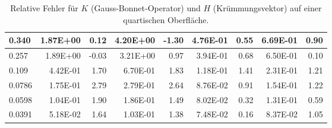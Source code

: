 \begin{table}[htbp]
\begin{tabular}{|l|r|r|r|r|r|r|r|r|}
            0.340 & 1.87E+00 & 0.12 & 4.20E+00 & -1.30 & 4.76E-01 & 0.55 & 6.69E-01 & 0.90 \\ \hline
            0.257 & 1.89E+00 & -0.03 & 3.21E+00 & 0.97 & 3.94E-01 & 0.68 & 6.50E-01 & 0.10 \\ \hline
            0.109 & 4.42E-01 & 1.70 & 6.70E-01 & 1.83 & 1.18E-01 & 1.41 & 2.31E-01 & 1.21 \\ \hline
            0.0786 & 1.75E-01 & 2.79 & 2.79E-01 & 2.64 & 8.76E-02 & 0.91 & 1.54E-01 & 1.22 \\ \hline
            0.0598 & 1.04E-01 & 1.90 & 1.86E-01 & 1.49 & 8.02E-02 & 0.32 & 1.31E-01 & 0.59 \\ \hline
            0.0391 & 5.18E-02 & 1.64 & 1.03E-01 & 1.38 & 7.48E-02 & 0.16 & 8.37E-02 & 1.05 \\ \hline
      \end{tabular}
      \caption[Gauß-Bonnet und Krümmungsvektor auf einer quartischen Oberfläche]{Relative Fehler für \( K \) (Gauss-Bonnet-Operator) und \( H \) (Krümmungsvektor) auf einer quartischen Oberfläche.}
      \label{tabHeineBGBLX}
   \end{table}

